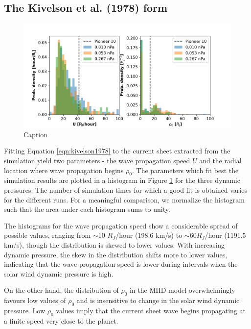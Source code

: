 \subsection{The Kivelson et al. (1978) form}

\begin{figure}
    \centering
    \includegraphics[width=\textwidth]{images6/comparison_highdynP_kivelson.png}
    \caption{Caption}
    \label{fig:comparison-hist-kivelson}
\end{figure}

Fitting Equation \ref{eqn:kivelson1978} to the current sheet extracted from the simulation yield two parameters - the wave propagation speed $U$ and the radial location where wave propagation begins $\rho_0$. The parameters which fit best the simulation results are plotted in a histogram in Figure 
\ref{fig:comparison-hist-kivelson} for the three dynamic pressures. The number of simulation times for which a good fit is obtained varies for the different runs. For a meaningful comparison, we normalize the histogram such that the area under each histogram sums to unity. 

The histograms for the wave propagation speed show a considerable spread of possible values, ranging from $\sim$10 $R_J$/hour (198.6 km/s) to $\sim60 R_J$/hour (1191.5 km/s), though the distribution is skewed to lower values. With increasing dynamic pressure, the skew in the distribution shifts more to lower values, indicating that the wave propagation speed is lower during intervals when the solar wind dynamic pressure is high. 

On the other hand, the distribution of $\rho_0$ in the MHD model overwhelmingly favours low values of $\rho_0$ and is insensitive to change in the solar wind dynamic pressure. Low $\rho_0$ values imply that the current sheet wave begins propagating at a finite speed very close to the planet. 


